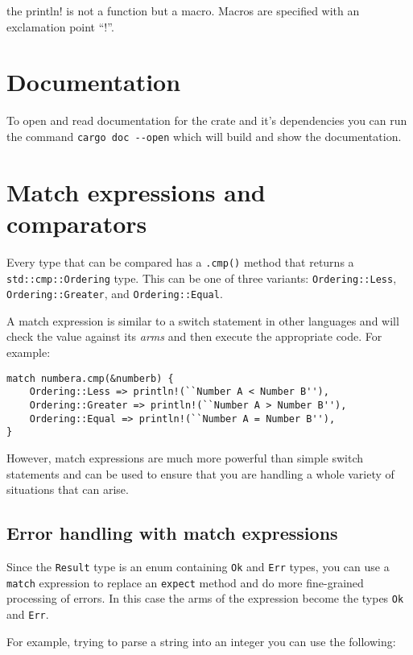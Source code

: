 \documentclass[12pt,notitlepage]{article}
\begin{document}
the println! is not a function but a macro. Macros are specified with an
exclamation point ``!''.

\section{Documentation}

To open and read documentation for the crate and it's dependencies you can run
the command \lstinline{cargo doc --open} which will build and show the
documentation.

\section{Match expressions and comparators}

Every type that can be compared has a \lstinline{.cmp()} method that returns a
\lstinline{std::cmp::Ordering} type. This can be one of three variants:
\lstinline{Ordering::Less}, \lstinline{Ordering::Greater}, and
\lstinline{Ordering::Equal}.

A match expression is similar to a switch statement in other languages and will
check the value against its \emph{arms} and then execute the appropriate code.
For example:

\begin{lstlisting}
match numbera.cmp(&numberb) {
    Ordering::Less => println!(``Number A < Number B''),
    Ordering::Greater => println!(``Number A > Number B''),
    Ordering::Equal => println!(``Number A = Number B''),
}
\end{lstlisting}

However, match expressions are much more powerful than simple switch statements
and can be used to ensure that you are handling a whole variety of situations
that can arise.

\subsection{Error handling with match expressions}

Since the \lstinline{Result} type is an enum containing \lstinline{Ok} and
\lstinline{Err} types, you can use a \lstinline{match} expression to replace an
\lstinline{expect} method and do more fine-grained processing of errors. In
this case the arms of the expression become the types \lstinline{Ok} and
\lstinline{Err}.

For example, trying to parse a string into an integer you can use the
following:
\end{document}
